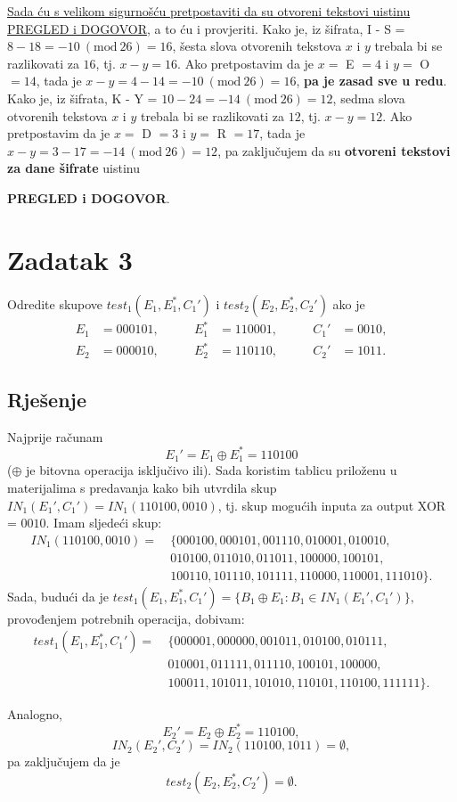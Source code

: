 \documentclass[a4paper,12pt,oneside]{article}
\begin{document}
\noindent \underline{Sada ću s velikom sigurnošću pretpostaviti da su otvoreni tekstovi uistinu PREGLED i DOGOVOR}, a to ću i provjeriti.
\newline \newline
\noindent Kako je, iz šifrata,  I - S = $8 - 18 = -10  \ (\text{mod} \ 26) = 16$, šesta slova otvorenih tekstova $x$ i $y$ trebala bi se razlikovati za $16$, tj. $x - y = 16$. 
Ako pretpostavim da je $x =$ E $=4$  i $y = $ O $= 14$, tada je $x - y = 4 - 14 = -10 \ (\text{mod} \ 26) = 16$, \textbf{pa je zasad sve u redu}.
\newline \newline
\noindent Kako je, iz šifrata,  K - Y = $10 - 24 = -14  \ (\text{mod} \ 26) = 12 $, sedma slova otvorenih tekstova $x$ i $y$ trebala bi se razlikovati za $12$, tj. $x - y = 12$. 
Ako pretpostavim da je $x =$ D $=3$  i $y = $ R $= 17$, tada je $x - y = 3 - 17 = -14 \ (\text{mod} \ 26) = 12$, pa zaključujem da su \textbf{otvoreni tekstovi za dane šifrate} uistinu
\begin{center}
	\textbf{PREGLED i DOGOVOR}.
\end{center}

\section*{Zadatak 3}
Odredite skupove $test_1(E_1, E_1^*, C_1') $ i $test_2(E_2, E_2^*, C_2')$ ako je
	\begin{align*}
		E_1 &= 000101, & \qquad E_1^* &= 110001, & \qquad C_1' &= 0010, \\
		E_2 &= 000010, & \qquad E_2^* &= 110110, & \qquad C_2' &= 1011.
	\end{align*}

\subsection*{Rješenje}
Najprije računam $$E_1' = E_1 \oplus E_1^* = 110100$$ ($\oplus$ je bitovna operacija isključivo ili). 
\newline
\newline
Sada koristim tablicu priloženu u materijalima s predavanja kako bih utvrdila skup $IN_1(E_1', C_1') = IN_1(110100, 0010)$, tj. skup mogućih inputa za output XOR = $0010$. 
\newline
Imam sljedeći skup:
\begin{align*}
IN_1(110100, 0010)= \ &\{000100, 000101, 001110, 010001, 010010, \\
                   &010100, 011010, 011011, 100000, 100101, \\
                   & 100110, 101110, 101111, 110000, 110001, 111010\}.
\end{align*}
Sada, budući da je
$test_1(E_1, E_1^*, C_1') = \{B_1 \oplus E_1 : B_1 \in IN_1(E_1', C_1')\},$
provođenjem potrebnih operacija, dobivam:
\begin{align*}
test_1(E_1, E_1^*, C_1')= \ &\{000001, 000000, 001011, 010100, 010111, \\
                           &010001, 011111, 011110, 100101, 100000, \\
                           &100011, 101011, 101010, 110101, 110100, 111111\}.
\end{align*}

\noindent Analogno, 
$$E_2' = E_2 \oplus E_2^* = 110100,$$
$$IN_2(E_2', C_2') = IN_2(110100, 1011) = \emptyset,$$
pa zaključujem da je 
$$test_2(E_2, E_2^*, C_2')= \emptyset.$$
\end{document}
